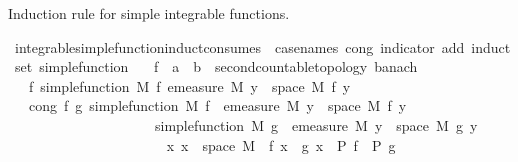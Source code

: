 \begin{isabellebody}
\begin{isamarkuptext}%
Induction rule for simple integrable functions.%
\end{isamarkuptext}\isamarkuptrue%
%
\isadelimimportant
%
\endisadelimimportant
%
\isatagimportant
{}\isamarkupfalse%
\ integrable{\isacharunderscore}{\kern0pt}simple{\isacharunderscore}{\kern0pt}function{\isacharunderscore}{\kern0pt}induct{\isacharbrackleft}{\kern0pt}consumes\ {}{\isacharcomma}{\kern0pt}\ case{\isacharunderscore}{\kern0pt}names\ cong\ indicator\ add{\isacharcomma}{\kern0pt}\ induct\ set{\isacharcolon}{\kern0pt}\ simple{\isacharunderscore}{\kern0pt}function{\isacharbrackright}{\kern0pt}{\isacharcolon}{\kern0pt}\isanewline
\ \ \ f\ {\isacharcolon}{\kern0pt}{\isacharcolon}{\kern0pt}\ {\isachardoublequoteopen}{\isacharprime}{\kern0pt}a\ {\isasymRightarrow}\ {\isacharprime}{\kern0pt}b\ {\isacharcolon}{\kern0pt}{\isacharcolon}{\kern0pt}\ {\isacharbraceleft}{\kern0pt}second{\isacharunderscore}{\kern0pt}countable{\isacharunderscore}{\kern0pt}topology{\isacharcomma}{\kern0pt}\ banach{\isacharbraceright}{\kern0pt}{\isachardoublequoteclose}\isanewline
\ \ \ f{\isacharcolon}{\kern0pt}\ {\isachardoublequoteopen}simple{\isacharunderscore}{\kern0pt}function\ M\ f{\isachardoublequoteclose}\ {\isachardoublequoteopen}emeasure\ M\ {\isacharbraceleft}{\kern0pt}y\ {\isasymin}\ space\ M{\isachardot}{\kern0pt}\ f\ y\ {\isasymnoteq}\ {}{\isacharbraceright}{\kern0pt}\ {\isasymnoteq}\ {\isasyminfinity}{\isachardoublequoteclose}\isanewline
\ \ \ cong{\isacharcolon}{\kern0pt}\ {\isachardoublequoteopen}{\isasymAnd}f\ g{\isachardot}{\kern0pt}\ simple{\isacharunderscore}{\kern0pt}function\ M\ f\ {\isasymLongrightarrow}\ emeasure\ M\ {\isacharbraceleft}{\kern0pt}y\ {\isasymin}\ space\ M{\isachardot}{\kern0pt}\ f\ y\ {\isasymnoteq}\ {}{\isacharbraceright}{\kern0pt}\ {\isasymnoteq}\ {\isasyminfinity}\ \isanewline
\ \ \ \ \ \ \ \ \ \ \ \ \ \ \ \ \ \ \ \ {\isasymLongrightarrow}\ simple{\isacharunderscore}{\kern0pt}function\ M\ g\ {\isasymLongrightarrow}\ emeasure\ M\ {\isacharbraceleft}{\kern0pt}y\ {\isasymin}\ space\ M{\isachardot}{\kern0pt}\ g\ y\ {\isasymnoteq}\ {}{\isacharbraceright}{\kern0pt}\ {\isasymnoteq}\ {\isasyminfinity}\ \isanewline
\ \ \ \ \ \ \ \ \ \ \ \ \ \ \ \ \ \ \ \ {\isasymLongrightarrow}\ {\isacharparenleft}{\kern0pt}{\isasymAnd}x{\isachardot}{\kern0pt}\ x\ {\isasymin}\ space\ M\ {\isasymLongrightarrow}\ f\ x\ {\isacharequal}{\kern0pt}\ g\ x{\isacharparenright}{\kern0pt}\ {\isasymLongrightarrow}\ P\ f\ {\isasymLongrightarrow}\ P\ g{\isachardoublequoteclose}\isanewline

\end{isabellebody}
